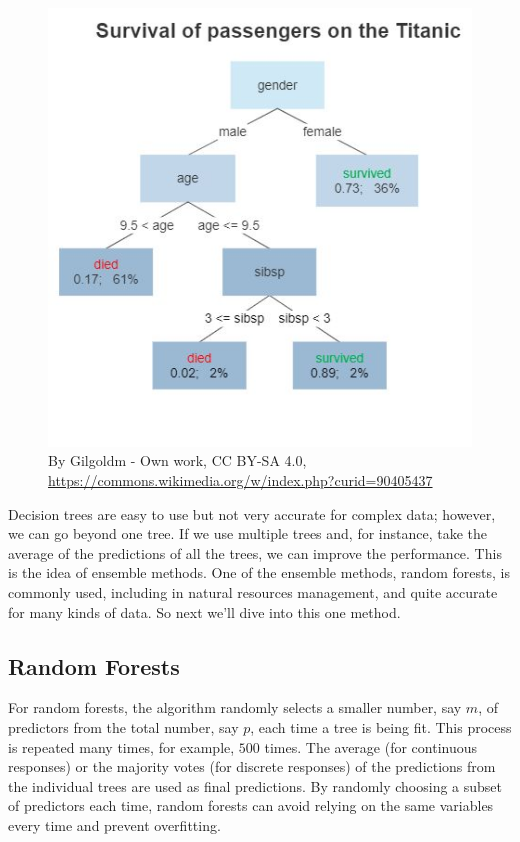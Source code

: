 \documentclass[
]{book}
\begin{document}
\begin{figure}
\centering
\includegraphics{images/Decision_Tree.jpg}
\caption{By Gilgoldm - Own work, CC BY-SA 4.0, \url{https://commons.wikimedia.org/w/index.php?curid=90405437}}
\end{figure}

Decision trees are easy to use but not very accurate for complex data; however, we can go beyond one tree. If we use multiple trees and, for instance, take the average of the predictions of all the trees, we can improve the performance. This is the idea of ensemble methods. One of the ensemble methods, random forests, is commonly used, including in natural resources management, and quite accurate for many kinds of data. So next we'll dive into this one method.

\hypertarget{random-forests}{%
\subsection{Random Forests}\label{random-forests}}

For random forests, the algorithm randomly selects a smaller number, say \(m\), of predictors from the total number, say \(p\), each time a tree is being fit. This process is repeated many times, for example, \(500\) times. The average (for continuous responses) or the majority votes (for discrete responses) of the predictions from the individual trees are used as final predictions. By randomly choosing a subset of predictors each time, random forests can avoid relying on the same variables every time and prevent overfitting.
\end{document}
